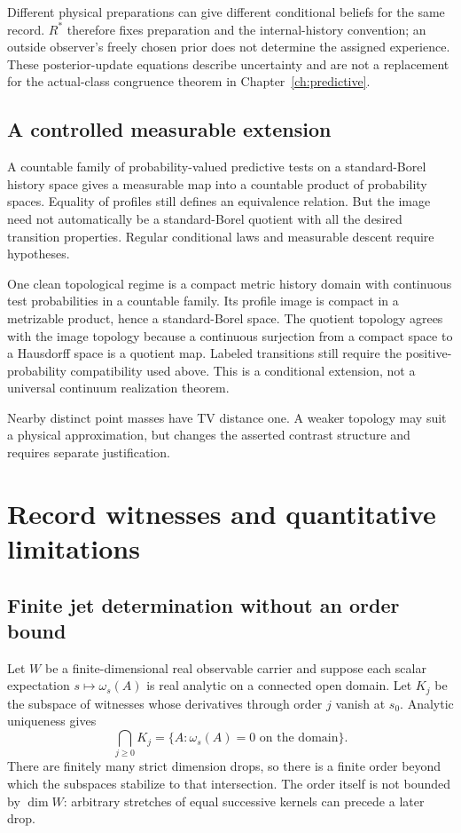 Different physical preparations can give different conditional beliefs for the same record. $R^\ast$ therefore fixes preparation and the internal-history convention; an outside observer's freely chosen prior does not determine the assigned experience. These posterior-update equations describe uncertainty and are not a replacement for the actual-class congruence theorem in Chapter~\ref{ch:predictive}.

\section{A controlled measurable extension}\label{section:predictive:a-controlled-measurable-extension}
A countable family of probability-valued predictive tests on a standard-Borel history space gives a measurable map into a countable product of probability spaces. Equality of profiles still defines an equivalence relation. But the image need not automatically be a standard-Borel quotient with all the desired transition properties. Regular conditional laws and measurable descent require hypotheses.

One clean topological regime is a compact metric history domain with continuous test probabilities in a countable family. Its profile image is compact in a metrizable product, hence a standard-Borel space. The quotient topology agrees with the image topology because a continuous surjection from a compact space to a Hausdorff space is a quotient map. Labeled transitions still require the positive-probability compatibility used above. This is a conditional extension, not a universal continuum realization theorem.

Nearby distinct point masses have TV distance one. A weaker topology may suit a physical approximation, but changes the asserted contrast structure and requires separate justification.

\chapter{Record witnesses and quantitative limitations}\label{app:witness}
\section{Finite jet determination without an order bound}\label{section:witness:finite-jet-determination-without-an-order-bound}
Let $W$ be a finite-dimensional real observable carrier and suppose each scalar expectation $s\mapsto\omega_s(A)$ is real analytic on a connected open domain. Let $K_j$ be the subspace of witnesses whose derivatives through order $j$ vanish at $s_0$. Analytic uniqueness gives
\[
\bigcap_{j\ge0}K_j=\{A:\omega_s(A)=0\text{ on the domain}\}.
\]
There are finitely many strict dimension drops, so there is a finite order beyond which the subspaces stabilize to that intersection. The order itself is not bounded by $\dim W$: arbitrary stretches of equal successive kernels can precede a later drop.

